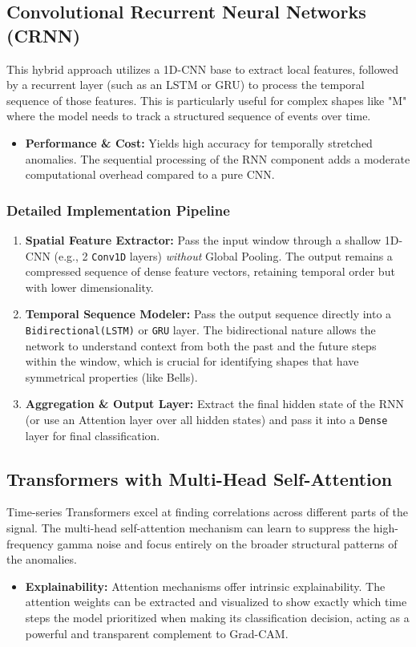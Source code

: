 \subsection{Convolutional Recurrent Neural Networks (CRNN)}
This hybrid approach utilizes a 1D-CNN base to extract local features, followed by a recurrent layer (such as an LSTM or GRU) to process the temporal sequence of those features. This is particularly useful for complex shapes like "M" where the model needs to track a structured sequence of events over time.
\begin{itemize}
    \item \textbf{Performance \& Cost:} Yields high accuracy for temporally stretched anomalies. The sequential processing of the RNN component adds a moderate computational overhead compared to a pure CNN.
\end{itemize}

\subsubsection*{Detailed Implementation Pipeline}
\begin{enumerate}
    \item \textbf{Spatial Feature Extractor:} Pass the input window through a shallow 1D-CNN (e.g., 2 \texttt{Conv1D} layers) \textit{without} Global Pooling. The output remains a compressed sequence of dense feature vectors, retaining temporal order but with lower dimensionality.
    \item \textbf{Temporal Sequence Modeler:} Pass the output sequence directly into a \texttt{Bidirectional(LSTM)} or \texttt{GRU} layer. The bidirectional nature allows the network to understand context from both the past and the future steps within the window, which is crucial for identifying shapes that have symmetrical properties (like Bells).
    \item \textbf{Aggregation \& Output Layer:} Extract the final hidden state of the RNN (or use an Attention layer over all hidden states) and pass it into a \texttt{Dense} layer for final classification.
\end{enumerate}

\subsection{Transformers with Multi-Head Self-Attention}
Time-series Transformers excel at finding correlations across different parts of the signal. The multi-head self-attention mechanism can learn to suppress the high-frequency gamma noise and focus entirely on the broader structural patterns of the anomalies.
\begin{itemize}
    \item \textbf{Explainability:} Attention mechanisms offer intrinsic explainability. The attention weights can be extracted and visualized to show exactly which time steps the model prioritized when making its classification decision, acting as a powerful and transparent complement to Grad-CAM.
\end{itemize}

